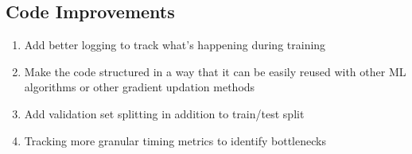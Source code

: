 \documentclass{article}
\begin{document}
\subsection{Code Improvements}
\begin{enumerate}
    \item Add better logging to track what's happening during training
    \item Make the code structured in a way that it can be easily reused with other ML algorithms or other gradient updation methods
    \item Add validation set splitting in addition to train/test split
    \item Tracking more granular timing metrics to identify bottlenecks

\end{enumerate}
\end{document}
